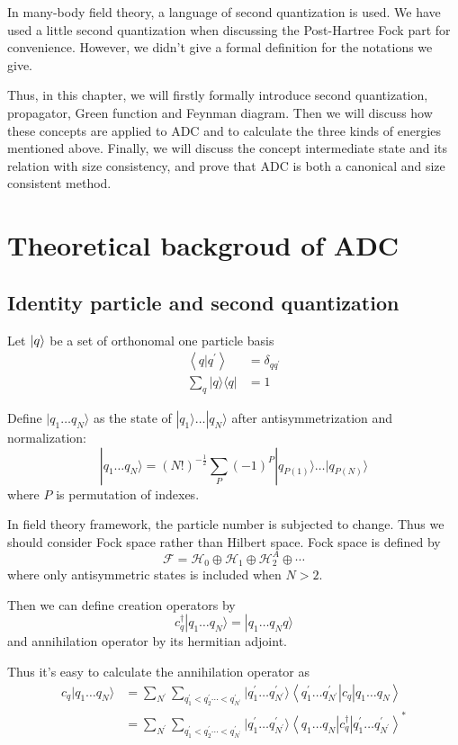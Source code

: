 \documentclass[bachelor, english]{ustcthesis}
\begin{document}
In many-body field theory, a language of second quantization is used.
We have used a little second quantization when discussing the Post-Hartree Fock part for convenience.
However, we didn't give a formal definition for the notations we give.

Thus, in this chapter, we will firstly formally introduce second quantization, propagator, Green function and Feynman diagram.
Then we will discuss how these concepts are applied to ADC and to calculate the three kinds of energies mentioned above.
Finally, we will discuss the concept intermediate state and its relation with size consistency, and prove that ADC is both a canonical and size consistent method.

\section{Theoretical backgroud of ADC}

\subsection{Identity particle and second quantization}
Let $\ket{q}$ be a set of orthonomal one particle basis
$$
\begin{aligned}
\left\langle q | q^{\prime}\right\rangle &=\delta_{q q^{\prime}} \\ \sum_{q} | q \rangle\langle q |&=1
\end{aligned}
$$

Define $| q_{1} \ldots q_{N} \rangle$ as the state of $| q_{1} \rangle \dots | q_{N} \rangle$ after antisymmetrization and normalization:
$$
| q_{1} \ldots q_{N} \rangle =(N !)^{-\frac{1}{2}} \sum_{P}(-1)^{P} | q_{P(1)} \rangle \ldots | q_{P(N)} \rangle
$$
where $P$ is permutation of indexes.

In field theory framework, the particle number is subjected to change.
Thus we should consider Fock space rather than Hilbert space.
Fock space is defined by
$$
\mathcal{F}=\mathcal{H}_{0} \oplus \mathcal{H}_{1} \oplus \mathcal{H}_{2}^{A} \oplus \cdots
$$
where only antisymmetric states is included when $N>2$.

Then we can define creation operators by 
$$
c_{q}^{\dagger} | q_{1} \ldots q_{N} \rangle=| q_{1} \ldots q_{N} q \rangle
$$
and annihilation operator by its hermitian adjoint.

Thus it's easy to calculate the annihilation operator as
$$
\begin{aligned}
	c_{q} | q_{1} \ldots q_{N} \rangle&=\sum_{N^{\prime}} \sum_{q_{1}^{\prime}<q_{2}^{\prime} \cdots<q_{N^{\prime}}^{\prime}} | q_{1}^{\prime} \ldots q_{N^{\prime}}^{\prime} \rangle\left\langle q_{1}^{\prime} \ldots q_{N^{\prime}}^{\prime}\left|c_{q}\right| q_{1} \ldots q_{N}\right\rangle
	\\
	&=\sum_{N^{\prime}} \sum_{q_{1}^{\prime}<q_{2}^{\prime} \cdots<q_{N^{\prime}}^{\prime}} | q_{1}^{\prime} \ldots q_{N^{\prime}}^{\prime} \rangle\left\langle q_{1} \ldots q_{N}\left|c_{q}^{\dagger}\right| q_{1}^{\prime} \ldots q_{N^{\prime}}^{\prime}\right\rangle^{*}
\end{aligned}
$$
\end{document}
